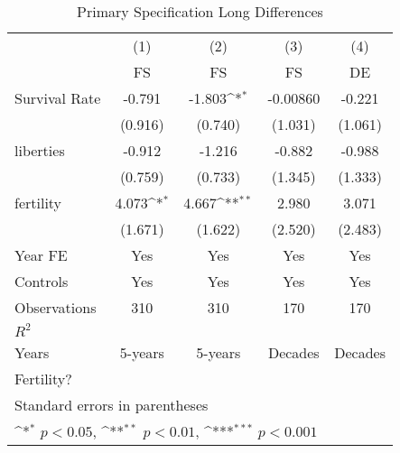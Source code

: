 \begin{table}[htbp]\centering
\def\sym#1{\ifmmode^{#1}\else\(^{#1}\)\fi}
\caption{Primary Specification Long Differences}
\begin{tabular}{l*{4}{c}}
\toprule
                &\multicolumn{1}{c}{(1)}&\multicolumn{1}{c}{(2)}&\multicolumn{1}{c}{(3)}&\multicolumn{1}{c}{(4)}\\
                &\multicolumn{1}{c}{FS}&\multicolumn{1}{c}{FS}&\multicolumn{1}{c}{FS}&\multicolumn{1}{c}{DE}\\
\midrule
Survival Rate   &   -0.791         &   -1.803\sym{*}  & -0.00860         &   -0.221         \\
                &  (0.916)         &  (0.740)         &  (1.031)         &  (1.061)         \\
\addlinespace
liberties       &   -0.912         &   -1.216         &   -0.882         &   -0.988         \\
                &  (0.759)         &  (0.733)         &  (1.345)         &  (1.333)         \\
\addlinespace
fertility       &    4.073\sym{*}  &    4.667\sym{**} &    2.980         &    3.071         \\
                &  (1.671)         &  (1.622)         &  (2.520)         &  (2.483)         \\
\addlinespace
Year FE         &      Yes         &      Yes         &      Yes         &      Yes         \\
\addlinespace
Controls        &      Yes         &      Yes         &      Yes         &      Yes         \\
\midrule
Observations    &      310         &      310         &      170         &      170         \\
\(R^{2}\)       &                  &                  &                  &                  \\
Years           &  5-years         &  5-years         &  Decades         &  Decades         \\
Fertility?      &                  &                  &                  &                  \\
\bottomrule
\multicolumn{5}{l}{\footnotesize Standard errors in parentheses}\\
\multicolumn{5}{l}{\footnotesize \sym{*} \(p<0.05\), \sym{**} \(p<0.01\), \sym{***} \(p<0.001\)}\\
\end{tabular}
\end{table}
